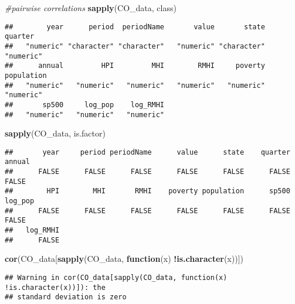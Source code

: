 \documentclass[
]{article}
\newenvironment{Shaded}{\begin{snugshade}}{\end{snugshade}}
\newcommand{\CommentTok}[1]{\textcolor[rgb]{0.56,0.35,0.01}{\textit{#1}}}
\newcommand{\ControlFlowTok}[1]{\textcolor[rgb]{0.13,0.29,0.53}{\textbf{#1}}}
\newcommand{\KeywordTok}[1]{\textcolor[rgb]{0.13,0.29,0.53}{\textbf{#1}}}
\newcommand{\NormalTok}[1]{#1}
\newcommand{\OperatorTok}[1]{\textcolor[rgb]{0.81,0.36,0.00}{\textbf{#1}}}
\begin{document}
\begin{Shaded}
\begin{Highlighting}[]
\CommentTok{#pairwise correlations}
\KeywordTok{sapply}\NormalTok{(CO_data, class)}
\end{Highlighting}
\end{Shaded}

\begin{verbatim}
##        year      period  periodName       value       state     quarter 
##   "numeric" "character" "character"   "numeric" "character"   "numeric" 
##      annual         HPI         MHI        RMHI     poverty  population 
##   "numeric"   "numeric"   "numeric"   "numeric"   "numeric"   "numeric" 
##       sp500     log_pop    log_RMHI 
##   "numeric"   "numeric"   "numeric"
\end{verbatim}

\begin{Shaded}
\begin{Highlighting}[]
\KeywordTok{sapply}\NormalTok{(CO_data, is.factor)}
\end{Highlighting}
\end{Shaded}

\begin{verbatim}
##       year     period periodName      value      state    quarter     annual 
##      FALSE      FALSE      FALSE      FALSE      FALSE      FALSE      FALSE 
##        HPI        MHI       RMHI    poverty population      sp500    log_pop 
##      FALSE      FALSE      FALSE      FALSE      FALSE      FALSE      FALSE 
##   log_RMHI 
##      FALSE
\end{verbatim}

\begin{Shaded}
\begin{Highlighting}[]
\KeywordTok{cor}\NormalTok{(CO_data[}\KeywordTok{sapply}\NormalTok{(CO_data, }\ControlFlowTok{function}\NormalTok{(x) }\OperatorTok{!}\KeywordTok{is.character}\NormalTok{(x))])}
\end{Highlighting}
\end{Shaded}

\begin{verbatim}
## Warning in cor(CO_data[sapply(CO_data, function(x) !is.character(x))]): the
## standard deviation is zero
\end{verbatim}
\end{document}
